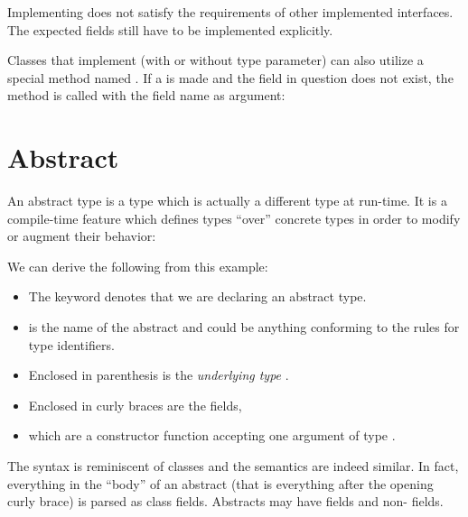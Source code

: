 
Implementing  does not satisfy the requirements of other implemented interfaces. The expected fields still have to be implemented explicitly.

Classes that implement  (with or without type parameter) can also utilize a special method named . If a  is made and the field in question does not exist, the  method is called with the field name as argument:




\section{Abstract}
\label{types-abstract}

An abstract type is a type which is actually a different type at run-time. It is a compile-time feature which defines types ``over'' concrete types in order to modify or augment their behavior:

We can derive the following from this example:

\begin{itemize}
	\item The keyword  denotes that we are declaring an abstract type.
	\item {} is the name of the abstract and could be anything conforming to the rules for type identifiers.
	\item Enclosed in parenthesis \expr{()} is the \emph{underlying type} .
	\item Enclosed in curly braces \expr{$\left\{\right\}$} are the fields,
	\item which are a constructor function  accepting one argument  of type .
\end{itemize}


The syntax is reminiscent of classes and the semantics are indeed similar. In fact, everything in the ``body'' of an abstract (that is everything after the opening curly brace) is parsed as class fields. Abstracts may have  fields and non-  fields.

